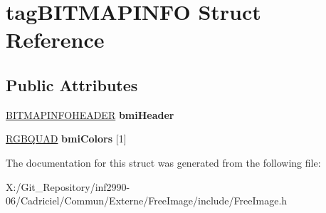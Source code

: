 \hypertarget{structtag_b_i_t_m_a_p_i_n_f_o}{\section{tag\-B\-I\-T\-M\-A\-P\-I\-N\-F\-O Struct Reference}
\label{structtag_b_i_t_m_a_p_i_n_f_o}
}
\subsection*{Public Attributes}
\begin{DoxyCompactItemize}
\item 
\hypertarget{structtag_b_i_t_m_a_p_i_n_f_o_a1cbcd562dccbedec498b504f247405c3}{\hyperlink{structtag_b_i_t_m_a_p_i_n_f_o_h_e_a_d_e_r}{B\-I\-T\-M\-A\-P\-I\-N\-F\-O\-H\-E\-A\-D\-E\-R} {\bfseries bmi\-Header}}\label{structtag_b_i_t_m_a_p_i_n_f_o_a1cbcd562dccbedec498b504f247405c3}

\item 
\hypertarget{structtag_b_i_t_m_a_p_i_n_f_o_a5a9747ecf91e36b60469f6483ec1980e}{\hyperlink{structtag_r_g_b_q_u_a_d}{R\-G\-B\-Q\-U\-A\-D} {\bfseries bmi\-Colors} \mbox{[}1\mbox{]}}\label{structtag_b_i_t_m_a_p_i_n_f_o_a5a9747ecf91e36b60469f6483ec1980e}

\end{DoxyCompactItemize}


The documentation for this struct was generated from the following file\-:\begin{DoxyCompactItemize}
\item 
X\-:/\-Git\-\_\-\-Repository/inf2990-\/06/\-Cadriciel/\-Commun/\-Externe/\-Free\-Image/include/Free\-Image.\-h\end{DoxyCompactItemize}
